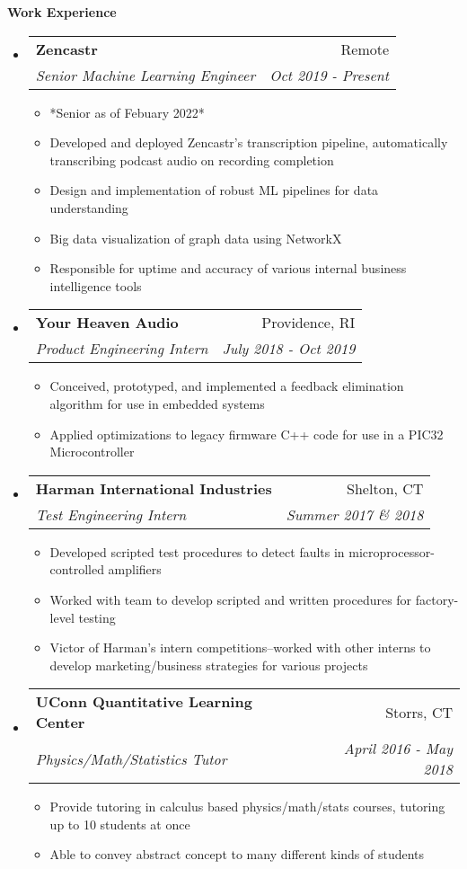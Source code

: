 \documentclass[letterpaper,11pt]{article}
\makeatletter
\newcommand{\resitem}[1]{\item #1 \vspace{-2pt}}
\newcommand{\resheading}[1]{{\large \colorbox{mygrey}{\begin{minipage}{\textwidth}{\textbf{#1 \vphantom{p\^{E}}}}\end{minipage}}}}
\newcommand{\ressubheading}[4]{
\begin{tabular*}{6.5in}{l@{\extracolsep{\fill}}r}
		\textbf{#1} & #2 \\
		\textit{#3} & \textit{#4} \\
\end{tabular*}\vspace{-6pt}}
\makeatother
\begin{document}
\resheading{Work Experience}
\begin{itemize}
\item
    \ressubheading{Zencastr}{Remote}{Senior Machine Learning Engineer}{Oct 2019 - Present}
	\begin{itemize}
        \resitem{*Senior as of Febuary 2022*}
		\resitem{Developed and deployed Zencastr's transcription pipeline, automatically transcribing podcast audio on recording completion}
        \resitem{Design and implementation of robust ML pipelines for data understanding}
        \resitem{Big data visualization of graph data using NetworkX}
        \resitem{Responsible for uptime and accuracy of various internal business intelligence tools}
	\end{itemize}

\item 
	\ressubheading{Your Heaven Audio}{Providence, RI}{Product Engineering Intern}{July 2018 - Oct 2019}
	\begin{itemize}
        \resitem{Conceived, prototyped, and implemented a feedback elimination algorithm for use in embedded systems}
        \resitem{Applied optimizations to legacy firmware C++ code for use in a PIC32 Microcontroller}
	\end{itemize}

\item
    \ressubheading{Harman International Industries}{Shelton, CT}{Test Engineering Intern}{Summer 2017 \& 2018}
    \begin{itemize}
        \resitem{Developed scripted test procedures to detect faults in microprocessor-controlled amplifiers}
        \resitem{Worked with team to develop scripted and written procedures for factory-level testing}
        \resitem{Victor of Harman's intern competitions--worked with other interns to develop
        marketing/business strategies for various projects}
    \end{itemize}

\item
	\ressubheading{UConn Quantitative Learning Center}{Storrs, CT}{Physics/Math/Statistics Tutor}{April 2016 - May 2018}
	\begin{itemize}
		\resitem{Provide tutoring in calculus based physics/math/stats courses, tutoring up to 10 students at once}
		\resitem{Able to convey abstract concept to many different kinds of students}
	\end{itemize}
\end{itemize}
\end{document}

